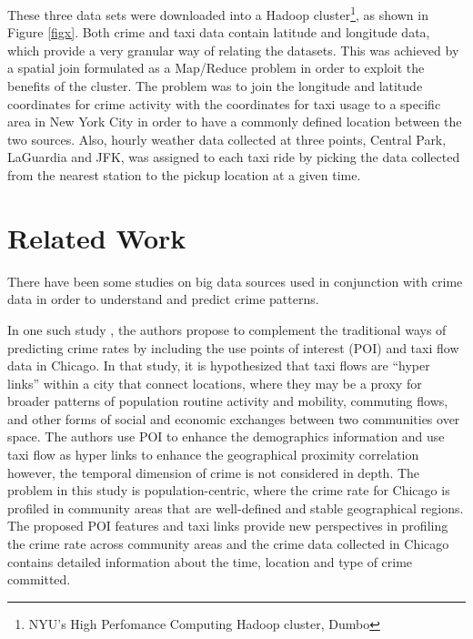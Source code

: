 \documentclass{sigkddExp}
\begin{document}
These three data sets were downloaded into a Hadoop cluster\footnote{NYU's High Perfomance Computing Hadoop cluster, Dumbo}, as shown in Figure \ref{figx}. Both crime and taxi data contain latitude and longitude data, which provide a very granular way of relating the datasets. 
This was achieved by a spatial join formulated as a Map/Reduce problem in order to exploit the benefits of the cluster. 
The problem was to join the longitude and latitude coordinates for crime activity with the coordinates for taxi usage to a specific area in New York City in order to have a commonly defined location between the two sources.
Also, hourly weather data collected at three points, Central Park, LaGuardia and JFK, was assigned to each taxi ride by picking the data collected from the nearest station to the pickup location at a given time. 





\section{Related Work}

There have been some studies on big data sources used in conjunction with crime data in order to understand and predict crime patterns. 

In one such study \cite{Wang16}, the authors propose to complement the traditional ways of predicting crime rates by including the use points of interest (POI) and taxi flow data in Chicago.  
In that study, it is hypothesized that taxi flows are ``hyper links'' within a city that connect locations, where they may be a proxy for broader patterns of population routine activity and mobility, commuting flows, and other forms of social and economic exchanges between two communities over space. The authors use POI to enhance the demographics information and use taxi flow as hyper links to enhance the geographical proximity correlation however, the temporal dimension of crime is not considered in depth. The problem in this study is population-centric, where the crime rate for Chicago is profiled in community areas that are well-defined and stable geographical regions. The proposed POI features and taxi links provide new perspectives in profiling the crime rate across community areas and the crime data collected in Chicago contains detailed information about the time, location and type of crime committed.
\end{document}

